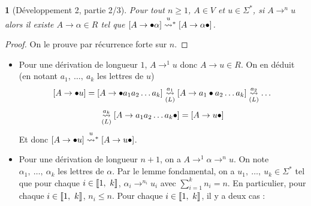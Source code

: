 \documentclass[11pt,a4paper]{article}
\theoremstyle{plain}
\theoremstyle{definition}
\theoremstyle{definition}
\theoremstyle{remark}
\theoremstyle{remark}
\theoremstyle{plain}
\newtheorem{lem}[thm]{\protect\lemmaname}
\theoremstyle{plain}
\theoremstyle{plain}
\theoremstyle{remark}
\providecommand{\lemmaname}{Lemme}
\begin{document}
\begin{lem}[Développement 2, partie 2/3]
	Pour tout $n\ge1$, $A\in V$ et $u\in\Sigma^{*}$, si $A\to^{n}u$
	alors il existe $A\to\alpha\in R$ tel que $\left[A\to\bullet\alpha\right]\transitionn u*\left[A\to\alpha\bullet\right]$.\label{lem:regle}\end{lem}
\begin{proof}
	On le prouve par récurrence forte sur $n$.\end{proof}
\begin{itemize}
	\item Pour une dérivation de longueur $1$, $A\to^{1}u$ donc $A\to u\in R$.
	On en déduit (en notant $a_{1},\ \dots,\ a_{k}$ les lettres de $u$)
	\[
	\left[A\to\bullet u\right]=\left[A\to\bullet a_{1}a_{2}\dots a_{k}\right]\underset{(L)}{\overset{a_{1}}{\leadsto}}\left[A\to a_{1}\bullet a_{2}\dots a_{k}\right]\underset{(L)}{\overset{a_{2}}{\leadsto}}\dots\]\[\underset{(L)}{\overset{a_{k}}{\leadsto}}\left[A\to a_{1}a_{2}\dots a_{k}\bullet\right]=\left[A\to u\bullet\right]
	\]
	Et donc $\left[A\to\bullet u\right]\transitionn u*\left[A\to u\bullet\right]$.
	\item Pour une dérivation de longueur $n+1$, on a $A\to^{1}\alpha\to^{n}u$.
	On note $\alpha_{1},\ \dots,\ \alpha_{k}$ les lettres de $\alpha$.
	Par le lemme fondamental, on a $u_{1},\ \dots,\ u_{k}\in\Sigma^{*}$
	tel que pour chaque $i\in\left\llbracket 1,\ k\right\rrbracket$, $\alpha_{i}\to^{n_{i}}u_{i}$
	avec ${\displaystyle \sum_{i=1}^{k}}n_{i}=n$. En particulier, pour
	chaque $i\in\left\llbracket 1,\ k\right\rrbracket$, $n_{i}\le n$. Pour chaque $i\in\left\llbracket 1,\ k\right\rrbracket$,
	il y a deux cas :
	

\end{itemize}
\end{document}
